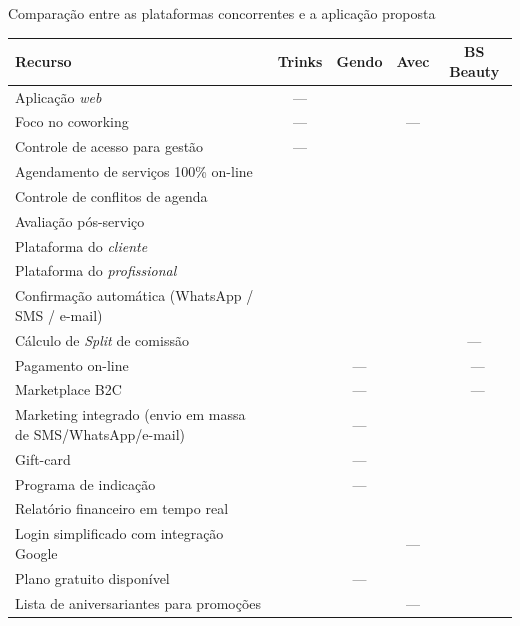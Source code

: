 \begin{quadro}[htb]
	\caption{\label{frame:comparativo_concorrência}Comparação entre as plataformas concorrentes e a aplicação proposta}
	\footnotesize
	\setlength{\tabcolsep}{4pt}
	\begin{tabular}{|p{6.8cm}|c|c|c|c|}
		\hline
		\textbf{Recurso}                                   & \textbf{Trinks} & \textbf{Gendo} & \textbf{Avec} & \textbf{BS Beauty}\\ \hline 
		Aplicação \textit{web}  & — & \checkmark & \checkmark & \checkmark \\ \hline
		Foco no coworking  & — & \checkmark & — & \checkmark \\ \hline
		Controle de acesso para gestão  & — & \checkmark  & \checkmark & \checkmark \\ \hline
		Agendamento de serviços 100\% on-line & \checkmark & \checkmark & \checkmark & \checkmark \\ \hline
		Controle de conflitos de agenda                    & \checkmark & \checkmark & \checkmark & \checkmark \\ \hline
		Avaliação pós-serviço  & \checkmark & \checkmark  & \checkmark  & \checkmark \\ \hline
		Plataforma do \textit{cliente}                               & \checkmark & \checkmark & \checkmark & \checkmark \\ \hline
		Plataforma do \textit{profissional}                                        & \checkmark & \checkmark & \checkmark & \checkmark \\ \hline
		Confirmação automática (WhatsApp / SMS / e-mail)                    & \checkmark & \checkmark & \checkmark & \checkmark \\ \hline
		Cálculo de \emph{Split} de comissão      & \checkmark & \checkmark & \checkmark & — \\ \hline
		Pagamento on-line                 & \checkmark & — & \checkmark & \ — \\ \hline
		Marketplace B2C                         & \checkmark & — & \checkmark & \ — \\ \hline
		Marketing integrado (envio em massa de SMS/WhatsApp/e-mail)  & \checkmark & — & \checkmark & \checkmark \\ \hline
		Gift-card                     & \checkmark & — & \checkmark & \checkmark \\ \hline
		Programa de indicação  & \checkmark & — & \checkmark & \checkmark \\ \hline
		Relatório financeiro em tempo real    & \checkmark & \checkmark & \checkmark & \checkmark \\ \hline
		Login simplificado com integração Google            & \checkmark & \checkmark &  — & \checkmark \\ \hline
		Plano gratuito disponível                                           & \checkmark & — & \checkmark & \checkmark \\ \hline
		Lista de aniversariantes para promoções  & \checkmark & \checkmark & — & \checkmark \\ \hline
		
	\end{tabular}
\end{quadro}
